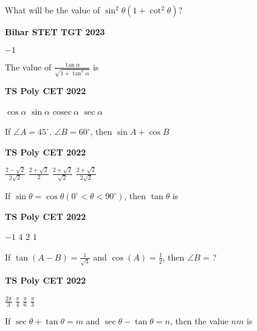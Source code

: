 \documentclass[11pt,paper=a4,answers]{exam}
\begin{document}
\begin{multicols}{2}
\begin{questions}
\columnbreak
\question What will be the value of  $\sin^2 \theta \left(1+\cot^2 \theta \right)$?

\begin{flushright}
\small\textbf{Bihar STET TGT 2023}
\end{flushright}


\begin{choices}
\choice $-1$
\end{choices}
\question The value of $\displaystyle \frac{\tan \alpha}{\sqrt{1+ \tan^2 \alpha} }  $ is
\begin{flushright}
\small\textbf{TS Poly CET 2022}
\end{flushright}


\begin{choices}
\choice $\displaystyle \cos \alpha$
\choice $\displaystyle \sin \alpha$
\choice $\displaystyle \textrm{cosec} \ \alpha$ 
\choice $\displaystyle \sec \alpha$
\end{choices}


\question If $\angle A=45^{\circ}$, $\angle B=60^{\circ}$, then $\sin A + \cos B$
\begin{flushright}
\small\textbf{TS Poly CET 2022}
\end{flushright}
\begin{choices}
\choice $\displaystyle \frac{2-\sqrt{2}}{2\sqrt{2}}$
\choice $\displaystyle \frac{2+\sqrt{2}}{{2}}$
\choice $\displaystyle \frac{2+\sqrt{2}}{\sqrt{2}}$
\choice $\displaystyle \frac{2+\sqrt{2}}{2\sqrt{2}}$
\end{choices}
\question 
If $\sin  \theta = \cos \theta \left(0^{\circ} < \theta < 90^{\circ}  \right)$, then $\tan \theta$ is
\begin{flushright}
\small\textbf{TS Poly CET 2022}
\end{flushright}


\begin{choices}
\choice $\displaystyle -1$ 
\choice $\displaystyle 4$ 
\choice $\displaystyle 2$ 
\choice $\displaystyle 1$  
\end{choices}
\columnbreak
\question If $\displaystyle \tan  \left(A-B \right) = \frac{1}{\sqrt{3}}$ and $\displaystyle \cos  \left(A \right) = \frac{1}{2}$, then $\angle B $ = ?
\begin{flushright}
\small\textbf{TS Poly CET 2022}
\end{flushright}

\begin{choices}
\choice $\displaystyle \frac{2 \pi }{3}$ 
\choice $\displaystyle \frac{\pi}{4}$
\choice $\displaystyle \frac{\pi}{6}$
 \choice $\displaystyle \frac{\pi}{3}$  
\end{choices}
\question If $\sec \theta + \tan  \theta = m$ and $\sec \theta - \tan  \theta = n$, then the value $nm$ is


\end{questions}
\end{multicols}
\end{document}

